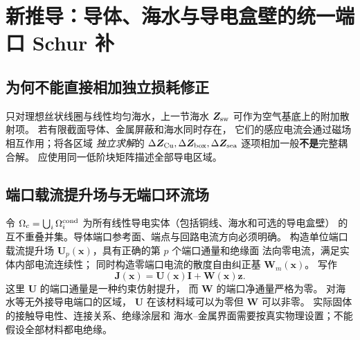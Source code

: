 \section{新推导：导体、海水与导电盒壁的统一端口 Schur 补}\label{sec:multidomain-schur}
\subsection{为何不能直接相加独立损耗修正}
只对理想丝状线圈与线性均匀海水，上一节海水
\(\bm Z_{\rm sw}\) 可作为空气基底上的附加散射项。
若有限截面导体、金属屏蔽和海水同时存在，
它们的感应电流会通过磁场相互作用；将各区域
\emph{独立求解}的 \(\Delta\bm Z_{\rm Cu},\Delta\bm Z_{\rm box},
\Delta\bm Z_{\rm sea}\) 逐项相加一般\textbf{不是}完整耦合解。
应使用同一低阶块矩阵描述全部导电区域。

\subsection{端口载流提升场与无端口环流场}
令 \(\Omega_c=\bigcup_i\Omega_i^{\rm cond}\)
为所有线性导电实体（包括铜线、海水和可选的导电盒壁）
的互不重叠并集。导体端口参考面、端点与回路电流方向必须明确。
构造单位端口载流提升场
\(\bm U_p(\bm x)\)，具有正确的第 \(p\) 个端口通量和绝缘面
法向零电流，满足实体内部电流连续性；
同时构造零端口电流的散度自由纠正基
\(\bm W_m(\bm x)\)。
写作
\begin{equation}
\boxed{
\bm J(\bm x)
=\bm U(\bm x)\bm I+\bm W(\bm x)\bm z.
}
\label{eq:joint-current}
\end{equation}
这里 \(\bm U\) 的端口通量是一种约束仿射提升，
而 \(\bm W\) 的端口净通量严格为零。
对海水等无外接导电端口的区域，
\(\bm U\) 在该材料域可以为零但 \(\bm W\) 可以非零。
实际固体的接触导电性、连接关系、绝缘涂层和
海水--金属界面需要按真实物理设置；不能假设全部材料都电绝缘。

